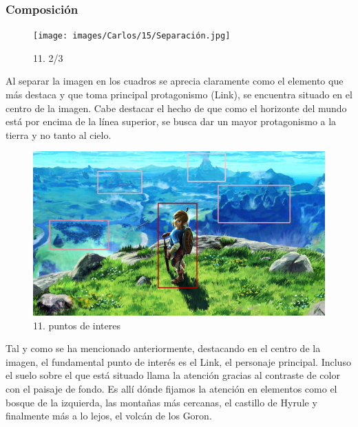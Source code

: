\documentclass[12pt]{article}
\begin{document}
          \subsubsection{Composición}
          \begin{figure}[H]
    \centering
    \texttt{[image: images/Carlos/15/Separación.jpg]}
    \caption{\small 11. 2/3}
  \end{figure}
  Al separar la imagen en los cuadros se aprecia claramente como el elemento que más destaca y que toma principal protagonismo (Link), se encuentra situado en el centro de la imagen. Cabe destacar el hecho de que como el horizonte del mundo está por encima de la línea superior, se busca dar un mayor protagonismo a la tierra y no tanto al cielo.

  \begin{figure}[H]
    \centering
    \includegraphics[width=\textwidth]{images/Carlos/15/CuadrosRositas.jpg}
    \caption{\small 11. puntos de interes}
  \end{figure}
  Tal y como se ha mencionado anteriormente, destacando en el centro de la imagen, el fundamental punto de interés es el Link, el personaje principal. Incluso el suelo sobre el que está situado llama la atención gracias al contraste de color con el paisaje de fondo. Es allí dónde fijamos la atención en elementos como el bosque de la izquierda, las montañas más cercanas, el castillo de Hyrule y finalmente más a lo lejos, el volcán de los Goron.
\end{document}
